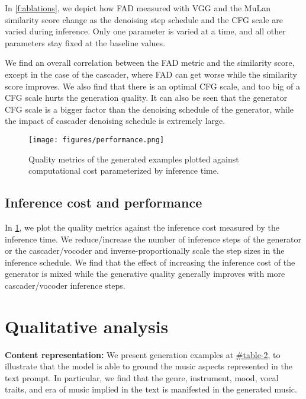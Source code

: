 In \cref{f:ablations}, we depict how FAD measured with VGG and the MuLan similarity score change as the denoising step schedule and the CFG scale are varied during inference. Only one parameter is varied at a time, and all other parameters stay fixed at the baseline values.

We find an overall correlation between the FAD metric and the similarity score, except in the case of the cascader, where FAD can get worse while the similarity score improves. We also find that there is an optimal CFG scale, and too big of a CFG scale hurts the generation quality. It can also be seen that the generator CFG scale is a bigger factor than the denoising schedule of the generator, while the impact of cascader denoising schedule is extremely large.

\begin{figure}[ht]
\begin{center}
\centerline{\texttt{[image: figures/performance.png]}}
\caption{Quality metrics of the generated examples plotted against computational cost parameterized by inference time.}
\label{f:cost}
\end{center}
\vskip -0.25in
\end{figure}

\subsection{Inference cost and performance}

In \cref{f:cost}, we plot the quality metrics against the inference cost measured by the inference time. We reduce/increase the number of inference steps of the generator or the cascader/vocoder and inverse-proportionally scale the step sizes in the inference schedule. We find that the effect of increasing the inference cost of the generator is mixed while the generative quality generally improves with more cascader/vocoder inference steps.

\section{Qualitative analysis}

\textbf{Content representation:}  We present generation examples at \href{\website#table-2}{\websiteDisplay\#table-2}, to illustrate that the model is able to ground the music aspects represented in the text prompt. In particular, we find that the genre, instrument, mood, vocal traits, and era of music implied in the text is manifested in the generated music.

